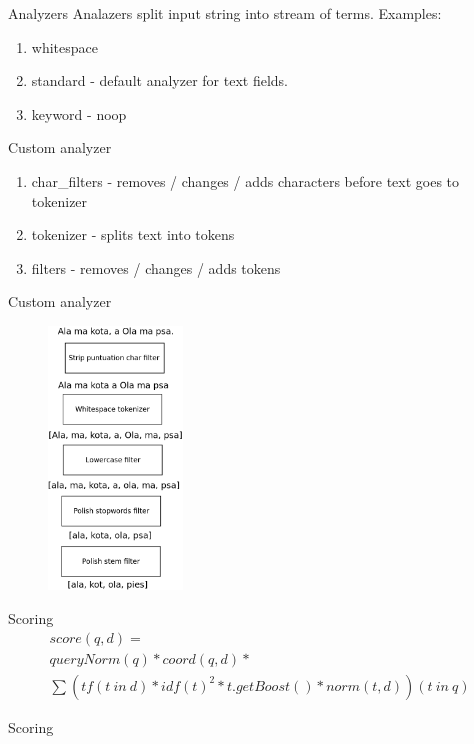 \documentclass{beamer}
\begin{document}
\begin{frame}{Analyzers}
	Analazers split input string into stream of terms. Examples:
	\begin{enumerate}
		\item whitespace
		\item standard - default analyzer for text fields.
		\item keyword - noop
	\end{enumerate}
\end{frame}{
\begin{frame}{Custom analyzer}
	\begin{enumerate}
		\item char\_filters - removes / changes / adds characters before text goes to tokenizer
		\item tokenizer - splits text into tokens
		\item filters - removes / changes / adds tokens
	\end{enumerate}
\end{frame}{
\begin{frame}{Custom analyzer}
	\begin{figure}
		\includegraphics[width=\textwidth,height=7cm,keepaspectratio=true]{analyzer}
	\end{figure}
\end{frame}
\begin{frame}{Scoring}
	\begin{equation*}
	\begin{multlined}
score(q,d) = \\
	queryNorm(q) * coord(q,d) * \\
	\sum(tf(t\ in\  d) *  idf(t)^2 * t.getBoost() *  norm(t,d)) (t\ in\ q)    
	\end{multlined}
	\end{equation*}
\end{frame}
\begin{frame}{Scoring}

\end{frame}}}
\end{document}
